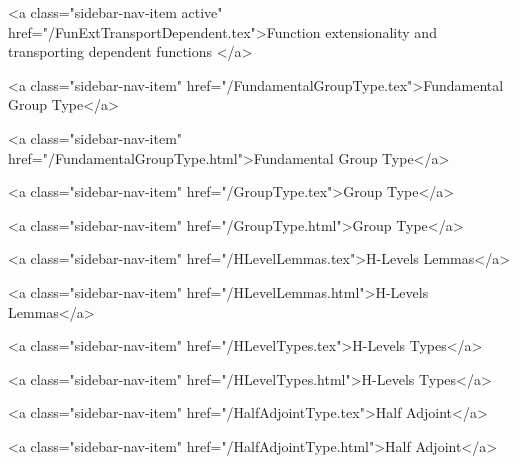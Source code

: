           <a class="sidebar-nav-item active" href="/FunExtTransportDependent.tex">Function extensionality and transporting dependent functions </a>
        
      
    
      
        
          <a class="sidebar-nav-item" href="/FundamentalGroupType.tex">Fundamental Group Type</a>
        
      
    
      
        
          <a class="sidebar-nav-item" href="/FundamentalGroupType.html">Fundamental Group Type</a>
        
      
    
      
        
          <a class="sidebar-nav-item" href="/GroupType.tex">Group Type</a>
        
      
    
      
        
          <a class="sidebar-nav-item" href="/GroupType.html">Group Type</a>
        
      
    
      
        
          <a class="sidebar-nav-item" href="/HLevelLemmas.tex">H-Levels Lemmas</a>
        
      
    
      
        
          <a class="sidebar-nav-item" href="/HLevelLemmas.html">H-Levels Lemmas</a>
        
      
    
      
        
          <a class="sidebar-nav-item" href="/HLevelTypes.tex">H-Levels Types</a>
        
      
    
      
        
          <a class="sidebar-nav-item" href="/HLevelTypes.html">H-Levels Types</a>
        
      
    
      
        
          <a class="sidebar-nav-item" href="/HalfAdjointType.tex">Half Adjoint</a>
        
      
    
      
        
          <a class="sidebar-nav-item" href="/HalfAdjointType.html">Half Adjoint</a>
        
